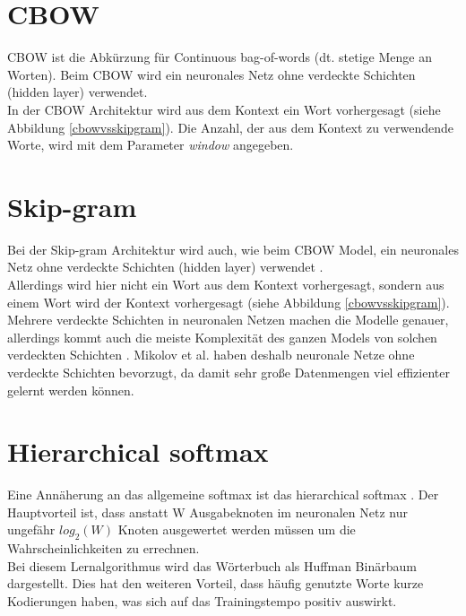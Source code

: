 \documentclass[12pt,a4paper]{report}
\begin{document}
\section{CBOW}
	CBOW ist die Abkürzung für Continuous bag-of-words (dt. stetige Menge an Worten). Beim CBOW wird ein neuronales Netz ohne verdeckte Schichten (hidden layer) verwendet\cite{DBLP:journals/corr/abs-1301-3781}.\\
	In der CBOW Architektur wird aus dem Kontext ein Wort vorhergesagt (siehe Abbildung \ref{cbowvsskipgram}). Die Anzahl, der aus dem Kontext zu verwendende Worte, wird mit dem Parameter \textit{window} angegeben.\\
	
	\section{Skip-gram}
	Bei der Skip-gram Architektur wird auch, wie beim CBOW Model, ein neuronales Netz ohne verdeckte Schichten (hidden layer) verwendet \citep{DBLP:journals/corr/abs-1301-3781}.\\
	Allerdings wird hier nicht ein Wort aus dem Kontext vorhergesagt, sondern aus einem Wort wird der Kontext vorhergesagt (siehe Abbildung \ref{cbowvsskipgram}).\\
	
	Mehrere verdeckte Schichten in neuronalen Netzen machen die Modelle genauer, allerdings kommt auch die meiste Komplexität des ganzen Models von solchen verdeckten Schichten \citep{DBLP:journals/corr/abs-1301-3781}. Mikolov et al. haben deshalb neuronale Netze ohne verdeckte Schichten bevorzugt, da damit sehr große Datenmengen viel effizienter gelernt werden können.\\
	
	\section{Hierarchical softmax}
	Eine Annäherung an das allgemeine softmax ist das hierarchical softmax \citep{DBLP:journals/corr/MikolovSCCD13}. Der Hauptvorteil ist, dass anstatt W Ausgabeknoten im neuronalen Netz nur ungefähr $log_2(W) $ Knoten ausgewertet werden müssen um die Wahrscheinlichkeiten zu errechnen. \\
	Bei diesem Lernalgorithmus wird das Wörterbuch als Huffman Binärbaum dargestellt. Dies hat den weiteren Vorteil, dass häufig genutzte Worte kurze Kodierungen haben, was sich auf das Trainingstempo positiv auswirkt.\\
	
\end{document}
